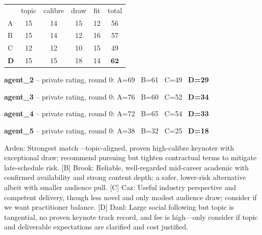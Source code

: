 \documentclass{article}
\begin{document}
\begin{tcolorbox}
\renewcommand{\arraystretch}{1.05}
\begin{tabular}{lccccc}
 & topic & calibre & draw & fit & total \\
A & 15 & 14 & 15 & 12 & 56 \\
B & 15 & 14 & 12 & 16 & 57 \\
C & 12 & 12 & 10 & 15 & 49 \\
\textbf{D} & 15 & 15 & 18 & 14 & $\mathbf{62}$ \\
\end{tabular}
\end{tcolorbox}

\begin{tcolorbox}
\textbf{agent\_2} -- private rating, round 0: A=69 \, B=61 \, C=49 \, \textbf{D=29}
\end{tcolorbox}

\begin{tcolorbox}
\textbf{agent\_3} -- private rating, round 0: A=76 \, B=60 \, C=52 \, \textbf{D=34}
\end{tcolorbox}

\begin{tcolorbox}
\textbf{agent\_4} -- private rating, round 0: A=72 \, B=65 \, C=54 \, \textbf{D=33}
\end{tcolorbox}

\begin{tcolorbox}
\textbf{agent\_5} -- private rating, round 0: A=38 \, B=32 \, C=25 \, \textbf{D=18}
\end{tcolorbox}

\begin{tcolorbox}[mbox-neutral={agent\_3 -- discussion r1}]
[A] Arden: Strongest match---topic-aligned, proven high-calibre keynoter with exceptional draw; recommend pursuing but tighten contractual terms to mitigate late-schedule risk.  
[B] Brook: Reliable, well-regarded mid-career academic with confirmed availability and strong content depth; a safer, lower-risk alternative albeit with smaller audience pull.  
[C] Caz: Useful industry perspective and competent delivery, though less novel and only modest audience draw; consider if we want practitioner balance.  
[D] Danl: Large social following but topic is tangential, no proven keynote track record, and fee is high---only consider if topic and deliverable expectations are clarified and cost justified.
\end{tcolorbox}
\end{document}
